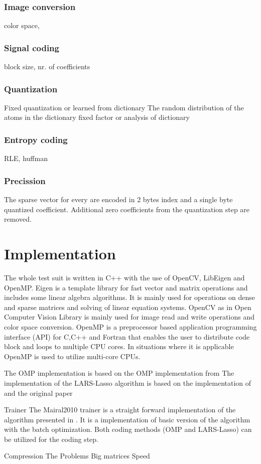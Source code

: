 \subsubsection*{Image conversion}
color space, 
\subsubsection*{Signal coding}
block size, nr. of coefficients
\subsubsection*{Quantization}
Fixed quantization or learned from dictionary
The random distribution of the atoms in the dictionary 
fixed factor or analysis of dictionary
\subsubsection*{Entropy coding}
RLE, huffman
\subsubsection*{Precission}
The sparse vector for every are encoded in 2 bytes index and a single byte quantized coefficient. Additional zero coefficients from the quantization step are removed.





\section{Implementation}
%

The whole test suit is written in C++ with the use of OpenCV, LibEigen and OpenMP.
Eigen \cite{Eigen} is a template library for fast vector and matrix operations and includes some linear algebra algorithms.
It is mainly used for operations on dense and sparse matrices and solving of linear equation systems.
OpenCV \cite{OpenCV} as in Open Computer Vision Library is mainly used for image read and write operations and color space conversion.
OpenMP \cite{OpenMP} is a preprocessor based application programming interface (API) for C,C++ and Fortran that enables 
the user to distribute code block and loops to multiple CPU cores. 
In situations where it is applicable OpenMP is used to utilize multi-core CPUs. 

The OMP implementation is based on the OMP implementation from \cite{Rubinstein}
The implementation of the LARS-Lasso algorithm is based on the implementation of \cite{Strand2005} and the original paper \cite{Efron2004}

Trainer
The Mairal2010 trainer is a straight forward implementation of the algorithm presented in \cite{Mairal2010}.
It is a implementation of basic version of the algorithm with the batch optimization. 
Both coding methods (OMP and LARS-Lasso) can be utilized for the coding step.


Compression
The 
Problems
Big matrices
Speed 

